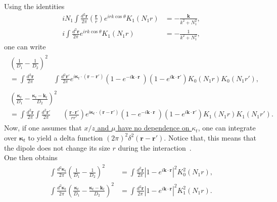 \documentclass[11pt]{article}
\numberwithin{equation}{section}
\numberwithin{table}{section}
\numberwithin{figure}{section}
\begin{document}
Using the identities \cite{Bartels:2002cj}
\begin{align}
	i N_1\int\frac{d^2\mathbf{r}}{2\pi} \left( \frac{\mathbf{r}}{r}\right) e^{i r k \cos\theta}K_1(N_1 r)&=- \frac{\mathbf{k}}{k^2+N_1^2},\\
	i \int\frac{d^2\mathbf{r}}{2\pi}e^{i r k \cos\theta}K_1(N_1 r)&=- \frac{1}{k^2+N_1^2},
\end{align}
one can write
\begin{align}
	\begin{split}
		\left(\frac{1}{D_1}-\frac{1}{D_2}\right)^2&\\
		=\int\frac{d^2\mathbf{r}}{2\pi}&\int\frac{d^2\mathbf{r}'}{2\pi}
		e^{i \boldsymbol{\kappa}_t\cdot(\mathbf{r}-\mathbf{r}')}
		\left(1 -e^{-i\mathbf{k}\cdot \mathbf{r}\phantom{'}}
		\right)
		\left(1 -e^{i\mathbf{k}\cdot \mathbf{r}'}
		\right)
		K_0(N_1 r)K_0(N_1 r'),
	\end{split}\\
	\begin{split}
		\left(\frac{\boldsymbol{\kappa}_t}{D_1}-\frac{\boldsymbol{\kappa}_t-\mathbf{k}_t}{D_2}\right)^2&\\
		=\int\frac{d^2\mathbf{r}}{2\pi}\int\frac{d^2\mathbf{r}'}{2\pi}&
		\left(\frac{\mathbf{r}\cdot\mathbf{r}'}{r r'}\right)
		e^{i \boldsymbol{\kappa}_t\cdot(\mathbf{r}-\mathbf{r}')}
		\left(1 -e^{-i\mathbf{k}\cdot \mathbf{r}\phantom{'}}
		\right)
		\left(1 -e^{i\mathbf{k}\cdot \mathbf{r}'}
		\right)
		K_1(N_1 r)K_1(N_1 r').
	\end{split}
\end{align}
Now, if one assumes that \underline{$x/z$ and $\mu$ have no dependence on $\kappa_t$}, one can integrate over $\boldsymbol{\kappa}_t$ to yield a delta function $(2\pi)^2 \delta^2(\mathbf{r}-\mathbf{r}')$. Notice that, this means that the dipole does not change its size $r$ during the interaction~\cite{Bartels:2002cj}.\\
One then obtains
\begin{align}
	\int \frac{d^2\boldsymbol{\kappa}_t}{2\pi}\left(\frac{1}{D_1}-\frac{1}{D_2}\right)^2
	&=\int\frac{d^2\mathbf{r}}{2\pi}
	\left |1 -e^{i\mathbf{k}\cdot \mathbf{r}}
	\right|^2
	K_0^2(N_1 r),
	\\
	\int \frac{d^2\boldsymbol{\kappa}_t}{2\pi}\left(\frac{\boldsymbol{\kappa}_t}{D_1}-\frac{\boldsymbol{\kappa}_t-\mathbf{k}_t}{D_2}\right)^2&
	=\int\frac{d^2\mathbf{r}}{2\pi}
	\left|1 -e^{i\mathbf{k}\cdot \mathbf{r}}
	\right|^2
	K_1^2(N_1 r).
\end{align}
\end{document}
